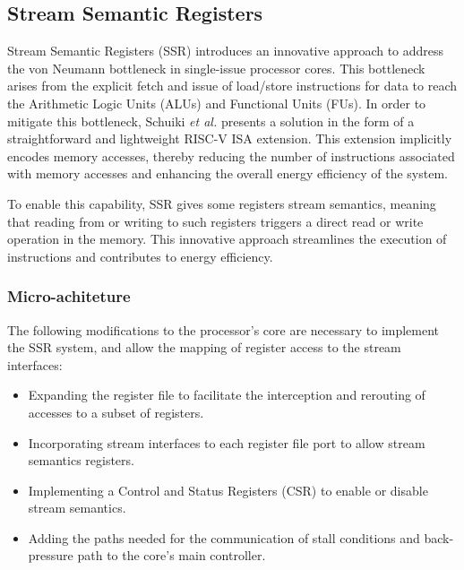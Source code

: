 \subsection{Stream Semantic Registers}
\label{label:ssr}

Stream Semantic Registers (SSR) \cite{9068465} introduces an innovative approach to address the von Neumann bottleneck in single-issue processor cores. This bottleneck arises from the explicit fetch and issue of load/store instructions for data to reach the Arithmetic Logic Units (ALUs) and Functional Units (FUs). In order to mitigate this bottleneck, Schuiki \textit{et al.} \cite{9068465} presents a solution in the form of a straightforward and lightweight RISC-V ISA extension. This extension implicitly encodes memory accesses, thereby reducing the number of instructions associated with memory accesses and enhancing the overall energy efficiency of the system.

To enable this capability, SSR gives some registers stream semantics, meaning that reading from or writing to such registers triggers a direct read or write operation in the memory. This innovative approach streamlines the execution of instructions and contributes to energy efficiency.

\subsubsection{Micro-achiteture}

The following modifications to the processor's core are necessary to implement the SSR system, and allow the mapping of register access to the stream interfaces:

\begin{itemize}
\item[]  Expanding the register file to facilitate the interception and rerouting of accesses to a subset of registers.
\item[]  Incorporating stream interfaces to each register file port to allow stream semantics registers.
\item[]  Implementing a Control and Status Registers (CSR) to enable or disable stream semantics.
\item[]  Adding the paths needed for the communication of stall conditions and back-pressure path to the core's main controller.
\end{itemize}

